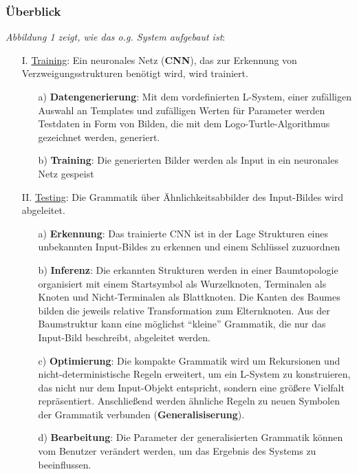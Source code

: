 \documentclass[11pt]{article}
\begin{document}
    \subsubsection{Überblick}
    \textit{Abbildung 1 zeigt, wie das o.g. System aufgebaut ist}:
    \begin{itemize}
        \item[I.] \underline{Training}: Ein neuronales Netz (\textbf{CNN}), das zur Erkennung von\\
        Verzweigungsstrukturen benötigt wird, wird trainiert.
        \begin{itemize}
            \item[a)] \textbf{Datengenerierung}: Mit dem vordefinierten L-System, einer zufälligen Auswahl an
            Templates und zufälligen Werten für Parameter werden Testdaten in Form von Bilden, die mit dem
            Logo-Turtle-Algorithmus gezeichnet werden, generiert.
            \item[b)] \textbf{Training}: Die generierten Bilder werden als Input in ein neuronales Netz gespeist
        \end{itemize}
        \item[II.] \underline{Testing}: Die Grammatik über Ähnlichkeitsabbilder des Input-Bildes wird abgeleitet.
        \begin{itemize}
            \item[a)] \textbf{Erkennung}: Das trainierte CNN ist in der Lage Strukturen eines unbekannten Input-Bildes
            zu erkennen und einem Schlüssel zuzuordnen
            \item[b)] \textbf{Inferenz}: Die erkannten Strukturen werden in einer Baumtopologie organisiert mit einem
            Startsymbol als Wurzelknoten, Terminalen als Knoten und Nicht-Terminalen als Blattknoten.
            Die Kanten des Baumes bilden die jeweils relative Transformation zum Elternknoten.
            Aus der Baumstruktur kann eine möglichst "`kleine"' Grammatik, die nur das Input-Bild beschreibt, abgeleitet
            werden.
            \item[c)] \textbf{Optimierung}: Die kompakte Grammatik wird um Rekursionen und nicht-deterministische
            Regeln erweitert, um ein L-System zu konstruieren, das nicht nur dem Input-Objekt entspricht, sondern
            eine größere Vielfalt repräsentiert.
            Anschließend werden ähnliche Regeln zu neuen Symbolen der Grammatik verbunden (\textbf{Generalisiserung}).
            \item[d)] \textbf{Bearbeitung}: Die Parameter der generalisierten Grammatik können vom Benutzer verändert
            werden, um das Ergebnis des Systems zu beeinflussen.
        \end{itemize}
    \end{itemize}
\end{document}
